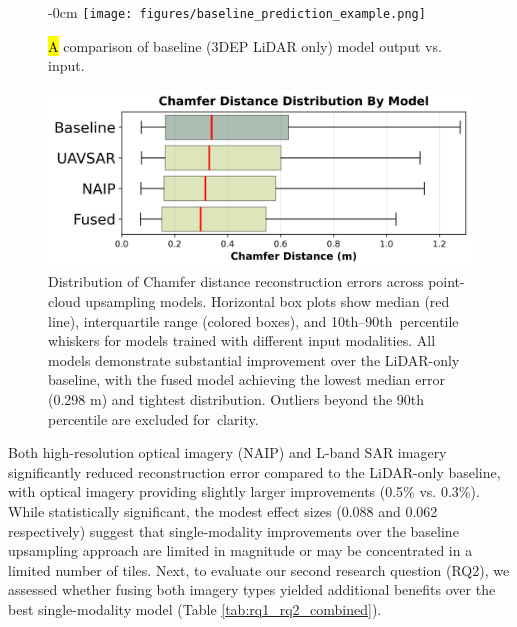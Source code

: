 \documentclass[remotesensing,article,accept,pdftex,moreauthors]{Definitions/mdpi}
\begin{document}
\begin{figure}[H] 
    
\begin{adjustwidth}{-\extralength}{0cm}
\centering %
\texttt{[image: figures/baseline\_prediction\_example.png]}
\end{adjustwidth}
    \caption{\hl{A} %
 comparison of baseline (3DEP LiDAR only) model output vs. input.}
    \label{fig:baseline_pt_cloud_example}
\end{figure}


\vspace{-10pt}

\begin{figure}[H]
    \includegraphics[width=0.75\linewidth]{figures/boxplot_by_model.png}
    \caption{Distribution of Chamfer distance reconstruction errors across point-cloud upsampling models. Horizontal box plots show median (red line), interquartile range (colored boxes), and \mbox{10th--90th percentile} whiskers for models trained with different input modalities. All models demonstrate substantial improvement over the LiDAR-only baseline, with the fused model achieving the lowest median error (0.298 m) and tightest distribution. Outliers beyond the 90th percentile are excluded \mbox{for clarity}.}
    \label{fig:boxplot_model_comparison}
\end{figure}



Both high-resolution optical imagery (NAIP) and L-band SAR imagery significantly reduced reconstruction error compared to the LiDAR-only baseline, with optical imagery providing slightly larger improvements (0.5\% vs. 0.3\%). While statistically significant, the modest effect sizes (0.088 and 0.062 respectively) suggest that single-modality improvements over the baseline upsampling approach are limited in magnitude or may be concentrated in a limited number of tiles. Next, to evaluate our second research question (RQ2), we assessed whether fusing both imagery types yielded additional benefits over the best single-modality model (Table \ref{tab:rq1_rq2_combined}).
\end{document}
